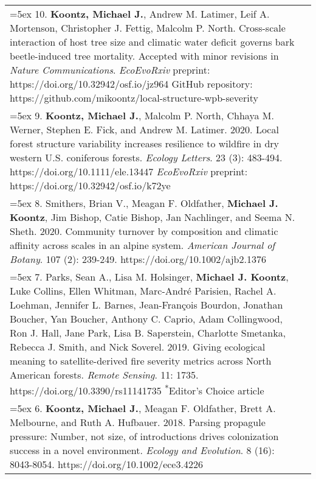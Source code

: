 \begin{longtable}{@{} >{\raggedright}p{5.25in} >{\raggedleft}X @{}}
\hangindent=5ex 10. \textbf{Koontz, Michael J.}, Andrew M. Latimer, Leif A. Mortenson, Christopher J. Fettig, Malcolm P. North. Cross-scale interaction of host tree size and climatic water deficit governs bark beetle-induced tree mortality. Accepted with minor revisions in \emph{Nature Communications}.
\newline \emph{EcoEvoRxiv} preprint: https://doi.org/10.32942/osf.io/jz964
\newline GitHub repository: https://github.com/mikoontz/local-structure-wpb-severity & 2020 \tabularnewline

\hangindent=5ex 9. \textbf{Koontz, Michael J.}, Malcolm P. North, Chhaya M. Werner, Stephen E. Fick, and Andrew M. Latimer. 2020. Local forest structure variability increases resilience to wildfire in dry western U.S. coniferous forests. \emph{Ecology Letters}. 23 (3): 483-494. https://doi.org/10.1111/ele.13447 \newline \emph{EcoEvoRxiv} preprint: https://doi.org/10.32942/osf.io/k72ye & 2020 \tabularnewline

\hangindent=5ex 8. Smithers, Brian V., Meagan F. Oldfather, \textbf{Michael J. Koontz}, Jim Bishop, Catie Bishop, Jan Nachlinger, and Seema N. Sheth. 2020. Community turnover by composition and climatic affinity across scales in an alpine system. \emph{American Journal of Botany}. 107 (2): 239-249. https://doi.org/10.1002/ajb2.1376 & 2020 \tabularnewline

\hangindent=5ex 7. Parks, Sean A., Lisa M. Holsinger, \textbf{Michael J. Koontz}, Luke Collins, Ellen Whitman, Marc-Andr\'e Parisien, Rachel A. Loehman, Jennifer L. Barnes, Jean-Fran\c{c}ois Bourdon, Jonathan Boucher, Yan Boucher, Anthony C. Caprio, Adam Collingwood, Ron J. Hall, Jane Park, Lisa B. Saperstein, Charlotte Smetanka, Rebecca J. Smith, and Nick Soverel. 2019. Giving ecological meaning to satellite-derived fire severity metrics across North American forests. \emph{Remote Sensing}. 11: 1735. https://doi.org/10.3390/rs11141735 \newline \textsuperscript{*}Editor's Choice article & 2019 \tabularnewline

\hangindent=5ex 6. \textbf{Koontz, Michael J.}, Meagan F. Oldfather, Brett A. Melbourne, and Ruth A. Hufbauer. 2018. Parsing propagule pressure: Number, not size, of introductions drives colonization success in a novel environment. \emph{Ecology and Evolution}. 8 (16): 8043-8054. https://doi.org/10.1002/ece3.4226 & 2018 \tabularnewline


\end{longtable}
